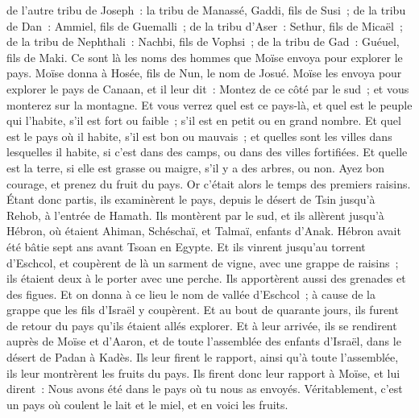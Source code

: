 \begin{multicols}{2}
de l'autre tribu de Joseph~: la tribu de Manassé, Gaddi, fils de Susi~;
de la tribu de Dan~: Ammiel, fils de Guemalli~;
de la tribu d'Aser~: Sethur, fils de Micaël~;
de la tribu de Nephthali~: Nachbi, fils de Vophsi~;
de la tribu de Gad~: Guéuel, fils de Maki.
Ce sont là les noms des hommes que Moïse envoya pour explorer le pays. Moïse donna à Hosée, fils de Nun, le nom de Josué.
Moïse les envoya pour explorer le pays de Canaan, et il leur dit~: Montez de ce côté par le sud~; et vous monterez sur la montagne.
Et vous verrez quel est ce pays-là, et quel est le peuple qui l'habite, s'il est fort ou faible~; s'il est en petit ou en grand nombre.
Et quel est le pays où il habite, s'il est bon ou mauvais~; et quelles sont les villes dans lesquelles il habite, si c'est dans des camps, ou dans des villes fortifiées.
Et quelle est la terre, si elle est grasse ou maigre, s'il y a des arbres, ou non. Ayez bon courage, et prenez du fruit du pays. Or c'était alors le temps des premiers raisins.
Étant donc partis, ils examinèrent le pays, depuis le désert de Tsin jusqu'à Rehob, à l'entrée de Hamath.
Ils montèrent par le sud, et ils allèrent jusqu'à Hébron, où étaient Ahiman, Schéschaï, et Talmaï, enfants d'Anak. Hébron avait été bâtie sept ans avant Tsoan en Egypte.
Et ils vinrent jusqu'au torrent d'Eschcol, et coupèrent de là un sarment de vigne, avec une grappe de raisins~; ils étaient deux à le porter avec une perche. Ils apportèrent aussi des grenades et des figues.
Et on donna à ce lieu le nom de vallée d'Eschcol~; à cause de la grappe que les fils d'Israël y coupèrent.
Et au bout de quarante jours, ils furent de retour du pays qu'ils étaient allés explorer.
Et à leur arrivée, ils se rendirent auprès de Moïse et d'Aaron, et de toute l'assemblée des enfants d'Israël, dans le désert de Padan à Kadès. Ils leur firent le rapport, ainsi qu'à toute l'assemblée, ils leur montrèrent les fruits du pays.
Ils firent donc leur rapport à Moïse, et lui dirent~: Nous avons été dans le pays où tu nous as envoyés. Véritablement, c'est un pays où coulent le lait et le miel, et en voici les fruits.

\end{multicols}
